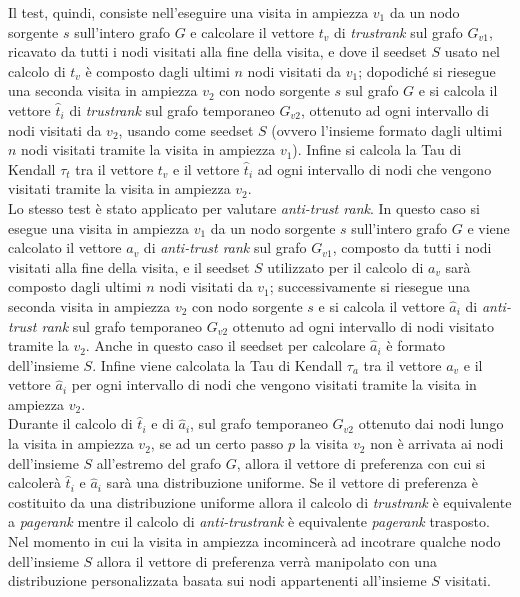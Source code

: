 Il test, quindi, consiste nell'eseguire una visita in ampiezza \(v_1\) da un nodo sorgente \(s\)  sull'intero grafo \(G\) e calcolare il vettore \(t_v\) di \textit{trustrank} sul grafo \(G_{v1}\), ricavato da tutti i nodi visitati alla fine della visita,  e dove il seedset \(S\) usato nel calcolo di \(t_v\) è composto dagli ultimi \(n\) nodi visitati da \(v_1\); dopodiché  si riesegue una seconda visita in ampiezza \(v_2\) con nodo sorgente \(s\) sul grafo \(G\) e si calcola il vettore \(\hat{t}_i\) di \textit{trustrank} sul grafo temporaneo \(G_{v2}\), ottenuto ad ogni intervallo di nodi visitati da \(v_2\), usando  come seedset \(S\) (ovvero l'insieme formato dagli ultimi \(n\) nodi visitati tramite la visita in ampiezza \(v_1\)).  Infine si calcola la Tau di Kendall \(\tau_t\) tra il vettore \(t_v\) e il vettore \(\hat{t}_i\) ad ogni intervallo di nodi che vengono visitati tramite la visita in ampiezza \(v_2\).\\
Lo stesso test è stato applicato per valutare \textit{anti-trust rank}. In questo caso si esegue una visita in ampiezza \(v_1\) da un nodo sorgente \(s\) sull'intero grafo \(G\) e viene calcolato il vettore \(a_v\) di \textit{anti-trust rank} sul grafo \(G_{v1}\), composto da tutti i nodi visitati alla fine della visita, e  il seedset \(S\) utilizzato per il calcolo di \(a_v\) sarà composto dagli ultimi \(n\) nodi visitati da \(v_1\); successivamente si riesegue una seconda visita in ampiezza \(v_2\) con nodo sorgente \(s\) e si calcola il vettore \(\hat{a}_i\) di \textit{anti-trust rank} sul grafo temporaneo \(G_{v2}\) ottenuto ad ogni intervallo di nodi visitato tramite la \(v_2\). Anche in questo caso il seedset per calcolare \(\hat{a}_i\) è formato dell'insieme \(S\). Infine  viene calcolata la Tau di Kendall \(\tau_a\) tra il vettore \(a_v\) e il vettore \(\hat{a}_i\) per ogni intervallo di nodi che vengono visitati tramite la visita in ampiezza \(v_2\).\\
Durante il calcolo di \(\hat{t}_i\) e di \(\hat{a}_i\), sul grafo temporaneo \(G_{v2}\) ottenuto dai nodi lungo la visita in ampiezza \(v_2\), se ad un certo passo \(p\) la visita \(v_2\) non  è arrivata ai nodi dell'insieme \(S\) all'estremo del grafo \(G\), allora il vettore di preferenza con cui si calcolerà \(\hat{t}_i\) e \(\hat{a}_i\) sarà una distribuzione uniforme. Se il vettore di preferenza è costituito da una distribuzione uniforme allora il calcolo di \textit{trustrank} è equivalente a \textit{pagerank} mentre il calcolo di \textit{anti-trustrank} è equivalente \textit{pagerank} trasposto. Nel momento in cui la visita in ampiezza incomincerà ad incotrare qualche nodo dell'insieme \(S\) allora il vettore di preferenza verrà manipolato con una distribuzione personalizzata basata sui nodi appartenenti all'insieme \(S\) visitati. \\
